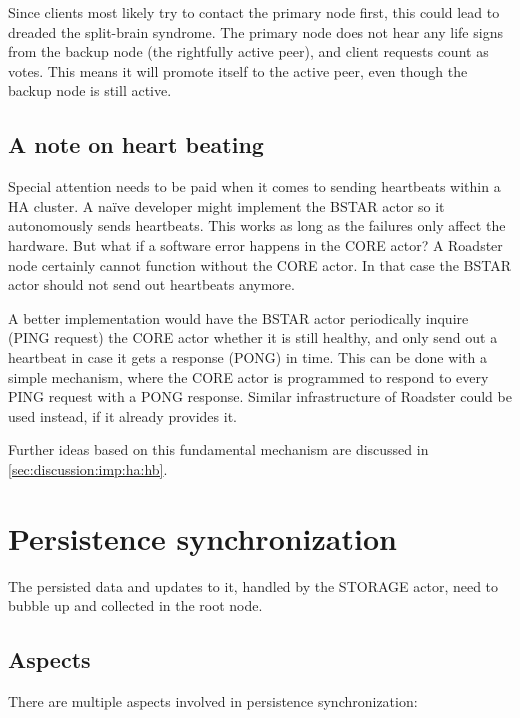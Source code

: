 Since clients most likely try to contact the primary node first, this could
lead to dreaded the split-brain syndrome. The primary node does not hear any
life signs from the backup node (the rightfully active peer), and client
requests count as votes. This means it will promote itself to the active peer,
even though the backup node is still active.

\subsection{A note on heart beating}\label{sec:approach:ha:hb}
Special attention needs to be paid when it comes to sending heartbeats within a
HA cluster. A na\"ive developer might implement the BSTAR actor so it
autonomously sends heartbeats. This works as long as the failures only affect
the hardware. But what if a software error happens in the CORE actor?  A
Roadster node certainly cannot function without the CORE actor. In that case the
BSTAR actor should not send out heartbeats anymore.

A better implementation would have the BSTAR actor periodically inquire (PING
request) the CORE actor whether it is still healthy, and only send out a
heartbeat in case it gets a response (PONG) in time. This can be done with a
simple mechanism, where the CORE actor is programmed to respond to every PING
request with a PONG response. Similar infrastructure of Roadster could be used
instead, if it already provides it.

Further ideas based on this fundamental mechanism are discussed in
\autoref{sec:discussion:imp:ha:hb}.

\section{Persistence synchronization}\label{sec:approach:psync}
The persisted data and updates to it, handled by the STORAGE actor, need to
bubble up and collected in the root node.

\subsection{Aspects}
There are multiple aspects involved in persistence synchronization:

